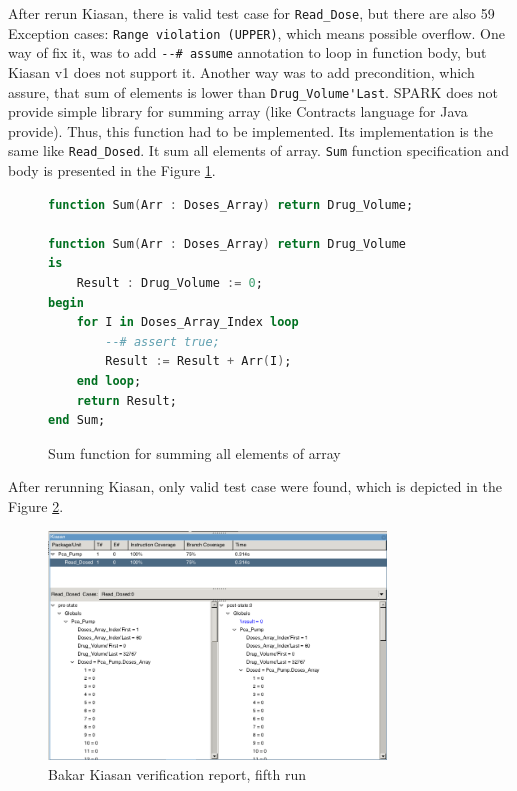 After rerun Kiasan, there is valid test case for \lstinline{Read_Dose}, but there are also 59 Exception cases: \lstinline{Range violation (UPPER)}, which means possible overflow. One way of fix it, was to add \lstinline{--# assume} annotation to loop in function body, but Kiasan v1 does not support it. Another way was to add precondition, which assure, that sum of elements is lower than \lstinline{Drug_Volume'Last}. SPARK does not provide simple library for summing array (like Contracts language for Java provide). Thus, this function had to be implemented. Its implementation is the same like \lstinline{Read_Dosed}. It sum all elements of array. \lstinline{Sum} function specification and body is presented in the Figure \ref{listing:sum_function}.

\begin{figure}
\singlespacing
\begin{lstlisting}[language=ada, frame=single, gobble=0]
function Sum(Arr : Doses_Array) return Drug_Volume;

function Sum(Arr : Doses_Array) return Drug_Volume
is
    Result : Drug_Volume := 0;
begin
    for I in Doses_Array_Index loop
        --# assert true;
        Result := Result + Arr(I);
    end loop;
    return Result;
end Sum;
\end{lstlisting}
\doublespacing
\caption{Sum function for summing all elements of array}
\label{listing:sum_function}
\end{figure}

After rerunning Kiasan, only valid test case were found, which is depicted in the Figure \ref{figure:sparkverification:kiasanreport5}.

\begin{figure}[ht]%
    \begin{center}
        \includegraphics[width=0.8\textwidth]{figures/pca-pump-verification-step5.png}        
    \end{center}
    \caption{Bakar Kiasan verification report, fifth run}
    \label{figure:sparkverification:kiasanreport5}
\end{figure}

